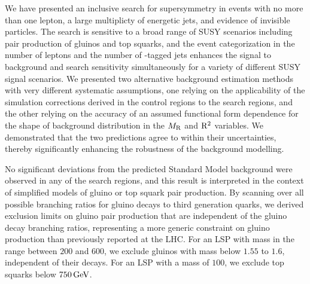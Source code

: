 We have presented an inclusive search for supersymmetry in events 
with no more than one lepton, a large multiplicty of energetic jets, and 
evidence of invisible particles. The search is sensitive to a broad
range of SUSY scenarios including pair production of gluinos and top
squarks, and the event categorization in the number of leptons and 
the number of \PQb-tagged jets enhances the signal to background and search
sensitivity simultaneously for a variety of different SUSY signal scenarios. 
We presented two alternative background estimation methods with very
different systematic assumptions, one relying on the applicability
of the simulation corrections derived in the control regions to the search regions, and 
the other relying on the accuracy of an assumed functional form dependence 
for the shape of background distribution in the $M_\mathrm{R}$ and $\mathrm{R}^2$ variables.
We demonstrated that the two predictions agree to within their uncertainties, 
thereby significantly enhancing the robustness of the background modelling. 

No significant deviations from the predicted Standard Model background were
observed in any of the search regions, and this result is interpreted
in the context of simplified models of gluino or top
squark pair production. By scanning over all possible branching ratios
for gluino decays to third generation quarks, we derived exclusion
limits on gluino pair production that are independent of the gluino
decay branching ratios, representing a more generic constraint on 
gluino production than previously reported at the LHC. 
For an LSP with mass in the range between $200$ and $600$\GeV, we exclude gluinos
with mass below $1.55$ to $1.6$\TeV, independent of their decays.
For an LSP with a mass of $100$\GeV, we exclude top squarks below $750 \,\text{Ge\hspace{-.08em}V}$. 

